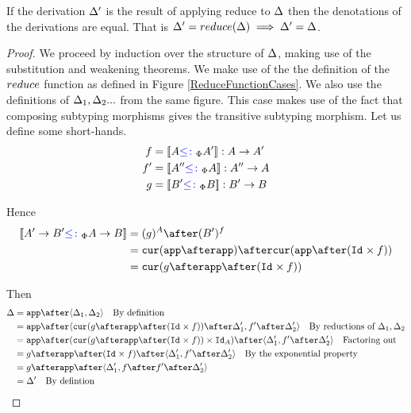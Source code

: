 \documentclass{Report}
\begin{document}
\begin{framed}
    \begin{theorem}\label{ReductionPreservesDenotations}
       If the derivation $\Delta'$ is the result of applying  reduce to $\Delta$ then the denotations of the derivations are equal. That is $\Delta' = reduce(\Delta) \implies \Delta' = \Delta$.
    \end{theorem}
    
    
    \begin{proof}
        We proceed by induction over the structure of $\Delta$, making use of the substitution and weakening theorems. We make use of the the definition of the $reduce$ function as defined in Figure \ref{ReduceFunctionCases}. We also use the definitions of $\Delta_1, \Delta_2 ...$ from the same figure.    
        \case{\vapply}
        This case makes use of the fact that composing subtyping morphisms gives the transitive subtyping morphism. Let us define some short-hands.
            \begin{align*}
                f & = {\bf [\![}A{\color{blue} \leq\colon}_\Phi A'{\bf ]\!]}: A\rightarrow A' \\
                f' & = {\bf [\![}A''{\color{blue} \leq\colon}_\Phi A{\bf ]\!]}: A'' \rightarrow A \\
                g & = {\bf [\![}B' {\color{blue} \leq\colon}_\Phi B{\bf ]\!]}: B' \rightarrow B \\
            \end{align*}
    
            Hence 
            \begin{align*}
                \deno{\fntype{A'}{B'}\subtypep \ab} & = (g)^A \after (B')^f \\
                & = \cur{\app\after \app}\after\cur{\app\after(\Id{}\times f)}\\
                & = \cur {g\after\app\after(\Id{}\times f)}
            \end{align*}
    
            Then 
            \begin{align*}
                \D & = \app\after\pr{\D_1}{\D_2}\qt{By definition}\\
                & = \app\after\pr{\cur {g\after\app\after(\Id{}\times f)}\after\D'_1}{f'\after\D'_2}\qt{By reductions of $\D_1, \D_2$}\\
                & = \app\after(\cur {g\after\app\after(\Id{}\times f)}\times\Id{A})\after\pr{\D'_1}{f'\after\D'_2} \qt{Factoring out}\\
                & = g\after\app\after(\Id{}\times f)\after\pr{\D'_1}{f'\after\D'_2}\qt{By the exponential property}\\
                & = g\after\app\after\pr{\D'_1}{f\after f'\after \D'_2}\\
                & = \D'\qt{By defintion}
            \end{align*}
            

\end{proof}
\end{framed}
\end{document}
